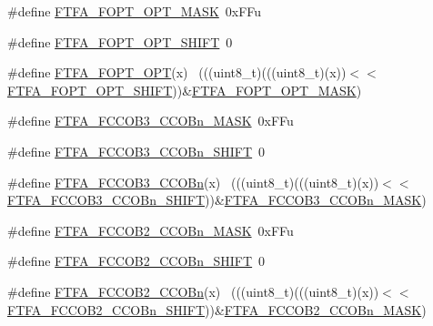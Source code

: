 \begin{DoxyCompactItemize}
\item 
\#define \hyperlink{group___f_t_f_a___register___masks_ga779df0be2be88c60f0c9e8e98850d479}{F\+T\+F\+A\+\_\+\+F\+O\+P\+T\+\_\+\+O\+P\+T\+\_\+\+M\+A\+SK}~0x\+F\+Fu
\item 
\#define \hyperlink{group___f_t_f_a___register___masks_ga89bbb59793ccc7cb270b4a285c73062f}{F\+T\+F\+A\+\_\+\+F\+O\+P\+T\+\_\+\+O\+P\+T\+\_\+\+S\+H\+I\+FT}~0
\item 
\#define \hyperlink{group___f_t_f_a___register___masks_ga3a5d86efa7984278bc9ae5e063415192}{F\+T\+F\+A\+\_\+\+F\+O\+P\+T\+\_\+\+O\+PT}(x)                                              ~(((uint8\+\_\+t)(((uint8\+\_\+t)(x))$<$$<$\hyperlink{group___f_t_f_a___register___masks_ga89bbb59793ccc7cb270b4a285c73062f}{F\+T\+F\+A\+\_\+\+F\+O\+P\+T\+\_\+\+O\+P\+T\+\_\+\+S\+H\+I\+FT}))\&\hyperlink{group___f_t_f_a___register___masks_ga779df0be2be88c60f0c9e8e98850d479}{F\+T\+F\+A\+\_\+\+F\+O\+P\+T\+\_\+\+O\+P\+T\+\_\+\+M\+A\+SK})
\item 
\#define \hyperlink{group___f_t_f_a___register___masks_gae1057e6e0ff5441696b4246e99fbd33f}{F\+T\+F\+A\+\_\+\+F\+C\+C\+O\+B3\+\_\+\+C\+C\+O\+Bn\+\_\+\+M\+A\+SK}~0x\+F\+Fu
\item 
\#define \hyperlink{group___f_t_f_a___register___masks_ga0ee905ea83a52a6a22d12666387f266b}{F\+T\+F\+A\+\_\+\+F\+C\+C\+O\+B3\+\_\+\+C\+C\+O\+Bn\+\_\+\+S\+H\+I\+FT}~0
\item 
\#define \hyperlink{group___f_t_f_a___register___masks_ga63553c17b66b2a4dcaa6ac9bae1bf2e7}{F\+T\+F\+A\+\_\+\+F\+C\+C\+O\+B3\+\_\+\+C\+C\+O\+Bn}(x)                                      ~(((uint8\+\_\+t)(((uint8\+\_\+t)(x))$<$$<$\hyperlink{group___f_t_f_a___register___masks_ga0ee905ea83a52a6a22d12666387f266b}{F\+T\+F\+A\+\_\+\+F\+C\+C\+O\+B3\+\_\+\+C\+C\+O\+Bn\+\_\+\+S\+H\+I\+FT}))\&\hyperlink{group___f_t_f_a___register___masks_gae1057e6e0ff5441696b4246e99fbd33f}{F\+T\+F\+A\+\_\+\+F\+C\+C\+O\+B3\+\_\+\+C\+C\+O\+Bn\+\_\+\+M\+A\+SK})
\item 
\#define \hyperlink{group___f_t_f_a___register___masks_gafce9dd30cc49db588976cffd40ff31a3}{F\+T\+F\+A\+\_\+\+F\+C\+C\+O\+B2\+\_\+\+C\+C\+O\+Bn\+\_\+\+M\+A\+SK}~0x\+F\+Fu
\item 
\#define \hyperlink{group___f_t_f_a___register___masks_gaf5731dc9ee3c6ce6fdd7c31a20bb0e6c}{F\+T\+F\+A\+\_\+\+F\+C\+C\+O\+B2\+\_\+\+C\+C\+O\+Bn\+\_\+\+S\+H\+I\+FT}~0
\item 
\#define \hyperlink{group___f_t_f_a___register___masks_gaa9e7183e2ccf47b3c252e0e0192fc352}{F\+T\+F\+A\+\_\+\+F\+C\+C\+O\+B2\+\_\+\+C\+C\+O\+Bn}(x)                                      ~(((uint8\+\_\+t)(((uint8\+\_\+t)(x))$<$$<$\hyperlink{group___f_t_f_a___register___masks_gaf5731dc9ee3c6ce6fdd7c31a20bb0e6c}{F\+T\+F\+A\+\_\+\+F\+C\+C\+O\+B2\+\_\+\+C\+C\+O\+Bn\+\_\+\+S\+H\+I\+FT}))\&\hyperlink{group___f_t_f_a___register___masks_gafce9dd30cc49db588976cffd40ff31a3}{F\+T\+F\+A\+\_\+\+F\+C\+C\+O\+B2\+\_\+\+C\+C\+O\+Bn\+\_\+\+M\+A\+SK})
$$
\end{DoxyCompactItemize}
